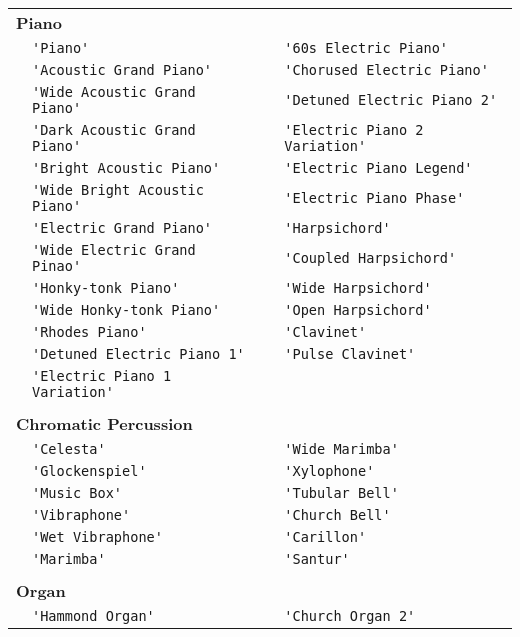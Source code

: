 \documentclass{article}
\newcommand{\instrusection}[1]{ \\[5pt] \multicolumn{4}{l}{\textbf{#1}}\\}
\newcommand\lvlo{}
\newcommand\lvlt{\ding{105}}
\begin{document}
\begin{center}
\begin{longtable}{ll|ll}
\instrusection{Piano}
 \lvlo & \lstinline!'Piano'! & \lvlt & \lstinline!'60s Electric Piano'! \\
 \lvlo & \lstinline!'Acoustic Grand Piano'! & \lvlo & \lstinline!'Chorused Electric Piano'! \\
 \lvlt & \lstinline!'Wide Acoustic Grand Piano'! & \lvlt & \lstinline!'Detuned Electric Piano 2'! \\
 \lvlt & \lstinline!'Dark Acoustic Grand Piano'! & \lvlt & \lstinline!'Electric Piano 2 Variation'! \\
 \lvlo & \lstinline!'Bright Acoustic Piano'! & \lvlt & \lstinline!'Electric Piano Legend'! \\
 \lvlt & \lstinline!'Wide Bright Acoustic Piano'! & \lvlt & \lstinline!'Electric Piano Phase'! \\
 \lvlo & \lstinline!'Electric Grand Piano'! & \lvlo & \lstinline!'Harpsichord'! \\
 \lvlt & \lstinline!'Wide Electric Grand Pinao'! & \lvlt & \lstinline!'Coupled Harpsichord'! \\
 \lvlo & \lstinline!'Honky-tonk Piano'! & \lvlt & \lstinline!'Wide Harpsichord'! \\
 \lvlt & \lstinline!'Wide Honky-tonk Piano'! & \lvlt & \lstinline!'Open Harpsichord'! \\
 \lvlo & \lstinline!'Rhodes Piano'! & \lvlo & \lstinline!'Clavinet'! \\
 \lvlt & \lstinline!'Detuned Electric Piano 1'! & \lvlt & \lstinline!'Pulse Clavinet'! \\
 \lvlt & \lstinline!'Electric Piano 1 Variation'! \\
\instrusection{Chromatic Percussion}
 \lvlo & \lstinline!'Celesta'! & \lvlt & \lstinline!'Wide Marimba'! \\
 \lvlo & \lstinline!'Glockenspiel'! & \lvlo & \lstinline!'Xylophone'! \\
 \lvlo & \lstinline!'Music Box'! & \lvlo & \lstinline!'Tubular Bell'! \\
 \lvlo & \lstinline!'Vibraphone'! & \lvlt & \lstinline!'Church Bell'! \\
 \lvlt & \lstinline!'Wet Vibraphone'! & \lvlo & \lstinline!'Carillon'! \\
 \lvlo & \lstinline!'Marimba'! & \lvlo & \lstinline!'Santur'! \\
\instrusection{Organ}
 \lvlo & \lstinline!'Hammond Organ'! & \lvlt & \lstinline!'Church Organ 2'! \\

\end{longtable}
\end{center}
\end{document}
